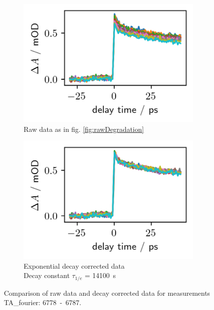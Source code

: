 \documentclass[twoside,openright]{scrreprt}
\begin{document}
\begin{figure}[hbtp]
\centering
\begin{subfigure}[t]{0.4\linewidth}
\centering
\includegraphics[scale=1]{images/DegradationRAWPump653Probe493-Graph.png}
\caption{Raw data as in fig. \ref{fig:rawDegradation}}
\end{subfigure}
\hfill
\begin{subfigure}[t]{0.4\linewidth}
\centering
\includegraphics[scale=1]{images/DegradationCorrectedPump653Probe493-Graph.png}
\caption{Exponential decay corrected data\\
Decay constant $\tau_{1/e}$ = \SI{14100}{\second}}
\end{subfigure}
\caption{Comparison of raw data and decay corrected data for measurements TA\_fourier: \mbox{6778 - 6787}.\label{fig:degradationCorrectionComparison}}
\end{figure}
\end{document}

